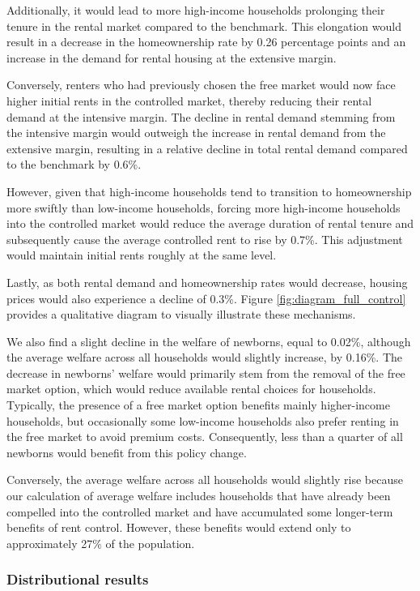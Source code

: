 \documentclass[parskip=full]{article}
\begin{document}
Additionally, it would lead to more high-income households prolonging their tenure in the rental market compared to the benchmark. This elongation would result in a decrease in the homeownership rate by 0.26 percentage points and an increase in the demand for rental housing at the extensive margin.

Conversely, renters who had previously chosen the free market would now face higher initial rents in the controlled market, thereby reducing their rental demand at the intensive margin. The decline in rental demand stemming from the intensive margin would outweigh the increase in rental demand from the extensive margin, resulting in a relative decline in total rental demand compared to the benchmark by 0.6\%.

However, given that high-income households tend to transition to homeownership more swiftly than low-income households, forcing more high-income households into the controlled market would reduce the average duration of rental tenure and subsequently cause the average controlled rent to rise by 0.7\%. This adjustment would maintain initial rents roughly at the same level.

Lastly, as both rental demand and homeownership rates would decrease, housing prices would also experience a decline of 0.3\%. Figure \ref{fig:diagram_full_control} provides a qualitative diagram to visually illustrate these mechanisms.

We also find a slight decline in the welfare of newborns, equal to 0.02\%, although the average welfare across all households would slightly increase, by 0.16\%. The decrease in newborns' welfare would primarily stem from the removal of the free market option, which would reduce available rental choices for households. Typically, the presence of a free market option benefits mainly higher-income households, but occasionally some low-income households also prefer renting in the free market to avoid premium costs. Consequently, less than a quarter of all newborns would benefit from this policy change.

Conversely, the average welfare across all households would slightly rise because our calculation of average welfare includes households that have already been compelled into the controlled market and have accumulated some longer-term benefits of rent control. However, these benefits would extend only to approximately 27\% of the population.

\subsubsection{Distributional results}
\end{document}
